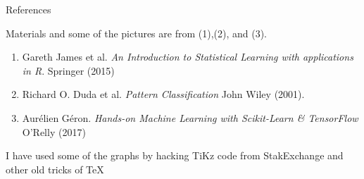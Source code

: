 \documentclass{beamer}
\begin{document}
\begin{frame}{References}
	
	Materials and some of the pictures are from (1),(2), and (3).
	\begin{enumerate}
		\item Gareth James et al. {\it An Introduction to Statistical Learning with applications in R}. Springer (2015)
		\item Richard O. Duda et al. {\it Pattern Classification} John Wiley (2001). 
		\item Aur\'elien G\'eron. {\it Hands-on Machine Learning with Scikit-Learn \& TensorFlow} O'Relly (2017)
		
	\end{enumerate}	
	
	I have used some of the graphs by hacking TiKz code from StakExchange and other old tricks of \TeX
\end{frame}		
\end{document}

